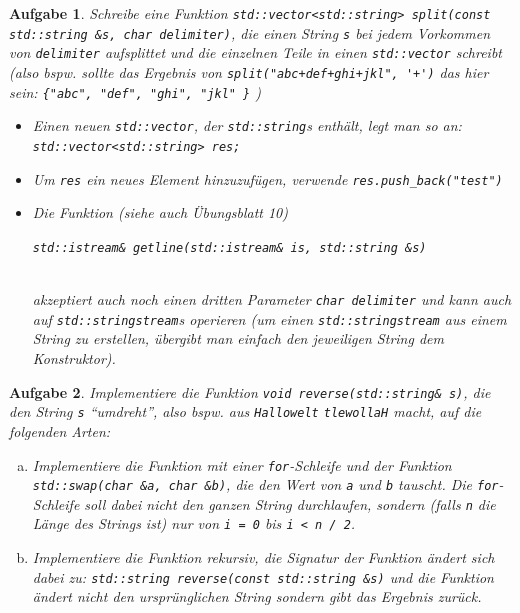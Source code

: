 \documentclass[a4paper,12pt,parskip=full]{scrartcl}
\theoremstyle{exercise}
\newtheorem{exercise}{Aufgabe}
\begin{document}
\begin{exercise}
Schreibe eine Funktion \lstinline{std::vector<std::string> split(const std::string &s, char delimiter)}, die einen String
\lstinline{s} bei jedem Vorkommen von \lstinline{delimiter}
aufsplittet und die einzelnen Teile in einen \lstinline{std::vector}
schreibt (also bspw. sollte das Ergebnis von
\lstinline|split("abc+def+ghi+jkl", '+')| das hier sein: \lstinline|{"abc", "def", "ghi", "jkl" }| )
\begin{itemize}
\item Einen neuen \lstinline{std::vector}, der \lstinline{std::string}s enthält, legt man so an: \\
  \lstinline{std::vector<std::string> res;}
\item Um \lstinline{res} ein neues Element hinzuzufügen, verwende
  \lstinline{res.push_back("test")}
\item Die Funktion (siehe auch Übungsblatt 10) \\
  \centerline{ \lstinline{std::istream& getline(std::istream& is, std::string &s)} } \\
  akzeptiert auch noch einen dritten Parameter \lstinline{char delimiter} und kann auch auf \lstinline{std::stringstream}s
  operieren (um einen \lstinline{std::stringstream} aus einem String
  zu erstellen, übergibt man einfach den jeweiligen String dem
  Konstruktor).
\end{itemize}
\end{exercise}

\begin{exercise}
Implementiere die Funktion \lstinline{void reverse(std::string& s)}, die den String \lstinline{s} ``umdreht'',
also bspw. aus \texttt{Hallowelt} \texttt{tlewollaH} macht, auf die
folgenden Arten:
\begin{enumerate}[a)]
\item Implementiere die Funktion mit einer \texttt{for}-Schleife und
  der Funktion \lstinline{std::swap(char &a, char &b)}, die den Wert
  von \texttt{a} und \texttt{b} tauscht. Die \texttt{for}-Schleife
  soll dabei \emph{nicht} den ganzen String durchlaufen, sondern
  (falls \texttt{n} die Länge des Strings ist) nur von \lstinline{i = 0} bis \lstinline{i < n / 2}.
\item Implementiere die Funktion rekursiv, die Signatur der Funktion
  ändert sich dabei zu: \lstinline{std::string reverse(const std::string &s)} und die Funktion ändert nicht den ursprünglichen
  String sondern gibt das Ergebnis zurück.
\end{enumerate}
\end{exercise}
\end{document}
